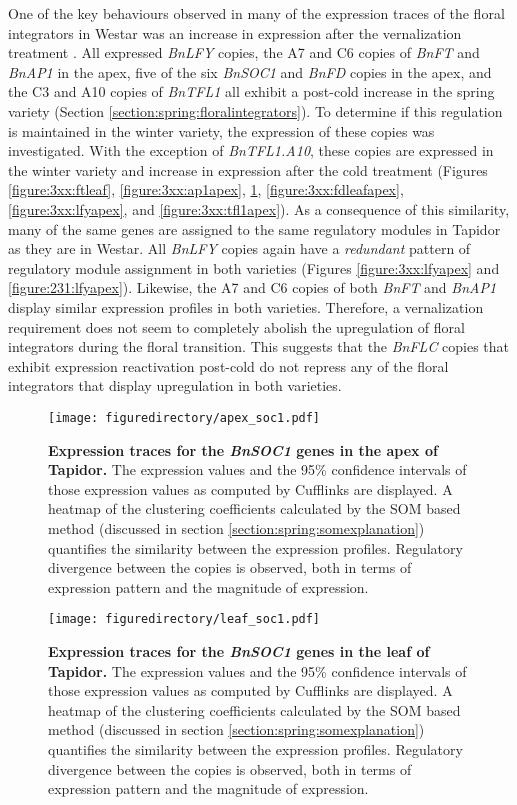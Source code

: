 \documentclass[12pt,]{book}
\begin{document}
One of the key behaviours observed in many of the expression traces of
the floral integrators in Westar was an increase in expression after the
vernalization treatment . All expressed \emph{BnLFY} copies, the A7 and
C6 copies of \emph{BnFT} and \emph{BnAP1} in the apex, five of the six
\emph{BnSOC1} and \emph{BnFD} copies in the apex, and the C3 and A10
copies of \emph{BnTFL1} all exhibit a post-cold increase in the spring
variety (Section \ref{section:spring:floralintegrators}). To determine
if this regulation is maintained in the winter variety, the expression
of these copies was investigated. With the exception of
\emph{BnTFL1.A10}, these copies are expressed in the winter variety and
increase in expression after the cold treatment (Figures
\ref{figure:3xx:ftleaf}, \ref{figure:3xx:ap1apex},
\ref{figure:3xx:soc1apex}, \ref{figure:3xx:fdleafapex},
\ref{figure:3xx:lfyapex}, and \ref{figure:3xx:tfl1apex}). As a
consequence of this similarity, many of the same genes are assigned to
the same regulatory modules in Tapidor as they are in Westar. All
\emph{BnLFY} copies again have a \emph{redundant} pattern of regulatory
module assignment in both varieties (Figures \ref{figure:3xx:lfyapex}
and \ref{figure:231:lfyapex}). Likewise, the A7 and C6 copies of both
\emph{BnFT} and \emph{BnAP1} display similar expression profiles in both
varieties. Therefore, a vernalization requirement does not seem to
completely abolish the upregulation of floral integrators during the
floral transition. This suggests that the \emph{BnFLC} copies that
exhibit expression reactivation post-cold do not repress any of the
floral integrators that display upregulation in both varieties.

\begin{figure}[htbp]
\centering
\texttt{[image: figuredirectory/apex\_soc1.pdf]}
\caption{\textbf{Expression traces for the \emph{BnSOC1} genes in the
apex of Tapidor.} The expression values and the 95\% confidence
intervals of those expression values as computed by Cufflinks are
displayed. A heatmap of the clustering coefficients calculated by the
SOM based method (discussed in section
\ref{section:spring:somexplanation}) quantifies the similarity between
the expression profiles. Regulatory divergence between the copies is
observed, both in terms of expression pattern and the magnitude of
expression.}\label{figure:3xx:soc1apex}
\end{figure}

\begin{figure}[htbp]
\centering
\texttt{[image: figuredirectory/leaf\_soc1.pdf]}
\caption{\textbf{Expression traces for the \emph{BnSOC1} genes in the
leaf of Tapidor.} The expression values and the 95\% confidence
intervals of those expression values as computed by Cufflinks are
displayed. A heatmap of the clustering coefficients calculated by the
SOM based method (discussed in section
\ref{section:spring:somexplanation}) quantifies the similarity between
the expression profiles. Regulatory divergence between the copies is
observed, both in terms of expression pattern and the magnitude of
expression.}\label{figure:3xx:soc1leaf}
\end{figure}
\end{document}
